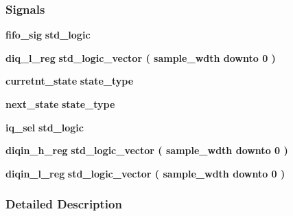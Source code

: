 \subsubsection*{Signals}
 \begin{DoxyCompactItemize}
\item 
{\bf fifo\+\_\+sig} {\bfseries \textcolor{comment}{std\+\_\+logic}\textcolor{vhdlchar}{ }} 
\item 
{\bf diq\+\_\+l\+\_\+reg} {\bfseries \textcolor{comment}{std\+\_\+logic\+\_\+vector}\textcolor{vhdlchar}{ }\textcolor{vhdlchar}{(}\textcolor{vhdlchar}{ }\textcolor{vhdlchar}{ }\textcolor{vhdlchar}{ }\textcolor{vhdlchar}{ }{\bfseries {\bf sample\+\_\+wdth}} \textcolor{vhdlchar}{ }\textcolor{keywordflow}{downto}\textcolor{vhdlchar}{ }\textcolor{vhdlchar}{ } \textcolor{vhdldigit}{0} \textcolor{vhdlchar}{ }\textcolor{vhdlchar}{)}\textcolor{vhdlchar}{ }} 
\item 
{\bf curretnt\+\_\+state} {\bfseries {\bfseries {\bf state\+\_\+type}} \textcolor{vhdlchar}{ }} 
\item 
{\bf next\+\_\+state} {\bfseries {\bfseries {\bf state\+\_\+type}} \textcolor{vhdlchar}{ }} 
\item 
{\bf iq\+\_\+sel} {\bfseries \textcolor{comment}{std\+\_\+logic}\textcolor{vhdlchar}{ }} 
\item 
{\bf diqin\+\_\+h\+\_\+reg} {\bfseries \textcolor{comment}{std\+\_\+logic\+\_\+vector}\textcolor{vhdlchar}{ }\textcolor{vhdlchar}{(}\textcolor{vhdlchar}{ }\textcolor{vhdlchar}{ }\textcolor{vhdlchar}{ }\textcolor{vhdlchar}{ }{\bfseries {\bf sample\+\_\+wdth}} \textcolor{vhdlchar}{ }\textcolor{keywordflow}{downto}\textcolor{vhdlchar}{ }\textcolor{vhdlchar}{ } \textcolor{vhdldigit}{0} \textcolor{vhdlchar}{ }\textcolor{vhdlchar}{)}\textcolor{vhdlchar}{ }} 
\item 
{\bf diqin\+\_\+l\+\_\+reg} {\bfseries \textcolor{comment}{std\+\_\+logic\+\_\+vector}\textcolor{vhdlchar}{ }\textcolor{vhdlchar}{(}\textcolor{vhdlchar}{ }\textcolor{vhdlchar}{ }\textcolor{vhdlchar}{ }\textcolor{vhdlchar}{ }{\bfseries {\bf sample\+\_\+wdth}} \textcolor{vhdlchar}{ }\textcolor{keywordflow}{downto}\textcolor{vhdlchar}{ }\textcolor{vhdlchar}{ } \textcolor{vhdldigit}{0} \textcolor{vhdlchar}{ }\textcolor{vhdlchar}{)}\textcolor{vhdlchar}{ }} 
\end{DoxyCompactItemize}


\subsubsection{Detailed Description}


